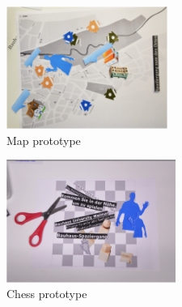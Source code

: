 \begin{figure}[H]
    \centering
    \begin{subfigure}[H]{0.45\textwidth}
        \centering
        \includegraphics[width=\textwidth,height=4cm]{Figures/4/map}
        \caption{Map prototype}
        \label{fig:mapprot}
    \end{subfigure}
    \hfill
    \begin{subfigure}[H]{0.45\textwidth}
        \centering
        \includegraphics[width=\textwidth,height=4cm]{Figures/4/chess}
        \caption{Chess prototype }
        \label{fig:chesspro}
    \end{subfigure}
    \caption{}
    \label{fig:map_chess_prototypes}
\end{figure}



